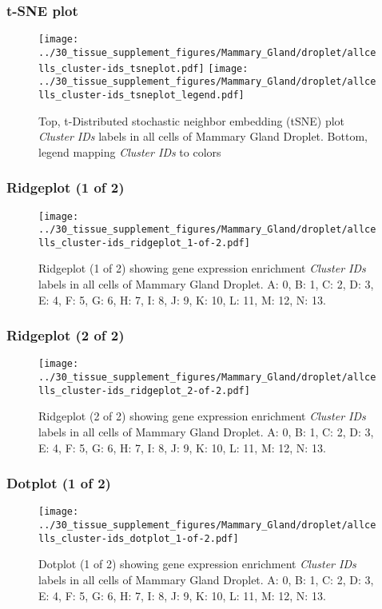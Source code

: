 \clearpage
\subsubsection{t-SNE plot}
\begin{figure}[h]
\centering
\texttt{[image: ../30\_tissue\_supplement\_figures/Mammary\_Gland/droplet/allcells\_cluster-ids\_tsneplot.pdf]}
\texttt{[image: ../30\_tissue\_supplement\_figures/Mammary\_Gland/droplet/allcells\_cluster-ids\_tsneplot\_legend.pdf]}
\caption{Top, t-Distributed stochastic neighbor embedding (tSNE) plot  \emph{Cluster IDs} labels in all cells of Mammary Gland Droplet. Bottom, legend mapping \emph{Cluster IDs} to colors}
\end{figure}


\clearpage

\subsubsection{Ridgeplot (1 of 2)}
\begin{figure}[h]
\centering
\texttt{[image: ../30\_tissue\_supplement\_figures/Mammary\_Gland/droplet/allcells\_cluster-ids\_ridgeplot\_1-of-2.pdf]}

\caption{ Ridgeplot (1 of 2)  showing gene expression enrichment \emph{Cluster IDs} labels in all cells of Mammary Gland Droplet. A: 0, B: 1, C: 2, D: 3, E: 4, F: 5, G: 6, H: 7, I: 8, J: 9, K: 10, L: 11, M: 12, N: 13.}
\end{figure}


\clearpage

\subsubsection{Ridgeplot (2 of 2)}
\begin{figure}[h]
\centering
\texttt{[image: ../30\_tissue\_supplement\_figures/Mammary\_Gland/droplet/allcells\_cluster-ids\_ridgeplot\_2-of-2.pdf]}

\caption{ Ridgeplot (2 of 2)  showing gene expression enrichment \emph{Cluster IDs} labels in all cells of Mammary Gland Droplet. A: 0, B: 1, C: 2, D: 3, E: 4, F: 5, G: 6, H: 7, I: 8, J: 9, K: 10, L: 11, M: 12, N: 13.}
\end{figure}


\clearpage

\subsubsection{Dotplot (1 of 2)}
\begin{figure}[h]
\centering
\texttt{[image: ../30\_tissue\_supplement\_figures/Mammary\_Gland/droplet/allcells\_cluster-ids\_dotplot\_1-of-2.pdf]}

\caption{ Dotplot (1 of 2)  showing gene expression enrichment \emph{Cluster IDs} labels in all cells of Mammary Gland Droplet. A: 0, B: 1, C: 2, D: 3, E: 4, F: 5, G: 6, H: 7, I: 8, J: 9, K: 10, L: 11, M: 12, N: 13.}
\end{figure}


